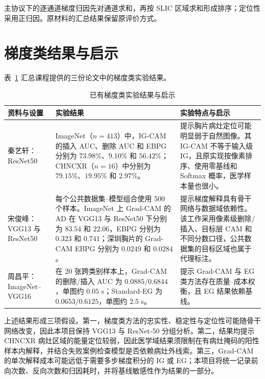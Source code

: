 主协议下的逐通道梯度归因先对通道求和，再按 SLIC 区域求和形成排序；定位性采用正归因。原材料的汇总结果保留原评价方式。

\section{梯度类结果与启示}

表~\ref{tab:prior-gradient-results} 汇总课程提供的三份论文中的梯度类实验结果。

\begin{table}[htbp]
    \centering
    \caption{已有梯度类实验结果与启示}
    \label{tab:prior-gradient-results}
    \footnotesize
    \begin{tabularx}{\textwidth}{>{\raggedright\arraybackslash}p{2.35cm}>{\raggedright\arraybackslash}X>{\raggedright\arraybackslash}X}
        \toprule
        资料与设置 & 实验结果 & 实验特点与启示 \\
        \midrule
        秦艺轩：ResNet50\cite{qin2026sgn} & ImageNet（$n=413$）中，IG-CAM 的插入 AUC、删除 AUC 和 EBPG 分别为 $73.98\%$、$9.10\%$ 和 $56.42\%$；CHNCXR（$n=16$）中分别为 $79.15\%$、$19.95\%$ 和 $2.97\%$。 & 提示胸片病灶定位可能明显弱于自然图像。其 IG-CAM 不等于输入级 IG，且原实现按像素排序、使用零基线和 Softmax 概率，医学样本量也很小。 \\
        \addlinespace
        宋俊峰：VGG13 与 ResNet50\cite{song2026shapleycam} & 每个公共数据集--模型组合使用 500 个样本。ImageNet 上 Grad-CAM 的 AD 在 VGG13 与 ResNet50 下分别为 $83.54$ 和 $22.06$，EBPG 分别为 $0.323$ 和 $0.741$；深圳胸片的 Grad-CAM EBPG 分别为 $0.0249$ 和 $0.0284$。 & 提示梯度解释具有骨干网络与数据域依赖性。该工作采用像素级删除/插入、目标层 CAM 和不同分数口径，公共数据集的目标区域也属于代理标注。 \\
        \addlinespace
        周昌平：ImageNet--VGG16\cite{zhou2026deepprior} & 在 20 张跨类别样本上，Grad-CAM 的删除/插入 AUC 为 $0.0885/0.6844$，单图约 $0.05$ s；Standard-EG 为 $0.0653/0.6125$，单图约 $2.5$ s。 & 提示 Grad-CAM 与 EG 类方法存在质量--成本权衡，且 EG 结果依赖基线。 \\
        \bottomrule
    \end{tabularx}
\end{table}

上述结果形成三项假设。第一，梯度类方法的忠实性、稳定性与定位性可能随骨干网络改变，因此本项目保持 VGG13 与 ResNet-50 分组分析。第二，结果均提示 CHNCXR 病灶区域的能量定位较弱，因此医学域结果须限制在有病灶掩码的阳性样本内解释，并结合失败案例检查模型是否依赖病灶外线索。第三，Grad-CAM 的单次解释成本可能远低于需要多步梯度积分的 IG 或 EG；本项目将统一记录前向次数、反向次数和归因耗时，并将基线敏感性作为结果的一部分。

